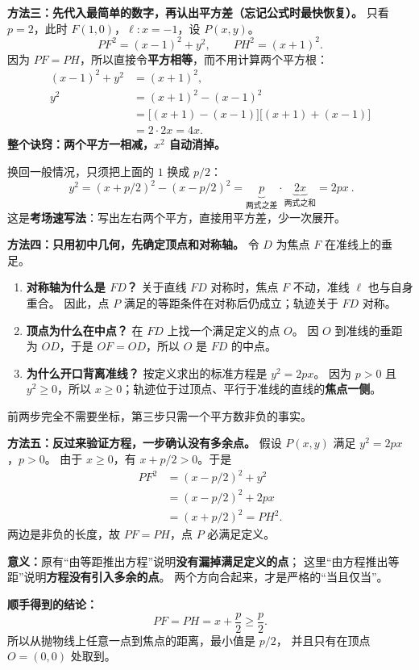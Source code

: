 \clearpage
\begin{proofbox}
\textbf{方法三：先代入最简单的数字，再认出平方差（忘记公式时最快恢复）。}
只看 $p=2$，此时 $F(1,0)$，$\ell:x=-1$，设 $P(x,y)$。
\[
PF^2=(x-1)^2+y^2,\qquad PH^2=(x+1)^2.
\]
因为 $PF=PH$，所以直接令\textbf{平方相等}，而不用计算两个平方根：
\[
\begin{aligned}
(x-1)^2+y^2&=(x+1)^2,\\
y^2&=(x+1)^2-(x-1)^2\\
&=\big[(x+1)-(x-1)\big]\big[(x+1)+(x-1)\big]\\
&=2\cdot2x=\boxed{4x}.
\end{aligned}
\]
\textbf{整个诀窍：两个平方一相减，$x^2$ 自动消掉。}

换回一般情况，只须把上面的 $1$ 换成 $p/2$：
\[
\boxed{\ y^2=(x+p/2)^2-(x-p/2)^2
=\underbrace{p}_{\text{两式之差}}\cdot\underbrace{2x}_{\text{两式之和}}=2px\ }.
\]
这是\textbf{考场速写法}：写出左右两个平方，直接用平方差，少一次展开。
\end{proofbox}
\clearpage
\begin{proofbox}
\textbf{方法四：只用初中几何，先确定顶点和对称轴。}
令 $D$ 为焦点 $F$ 在准线上的垂足。
\begin{enumerate}[leftmargin=*]
\item \textbf{对称轴为什么是 $FD$？} 关于直线 $FD$ 对称时，焦点 $F$ 不动，准线 $\ell$ 也与自身重合。
因此，点 $P$ 满足的等距条件在对称后仍成立；轨迹关于 $FD$ 对称。
\item \textbf{顶点为什么在中点？} 在 $FD$ 上找一个满足定义的点 $O$。
因 $O$ 到准线的垂距为 $OD$，于是 $OF=OD$，所以 $O$ 是 $FD$ 的中点。
\item \textbf{为什么开口背离准线？} 按定义求出的标准方程是 $y^2=2px$。
因为 $p>0$ 且 $y^2\ge0$，所以 $x\ge0$；轨迹位于过顶点、平行于准线的直线的\textbf{焦点一侧}。
\end{enumerate}
前两步完全不需要坐标，第三步只需一个平方数非负的事实。
\end{proofbox}
\clearpage
\begin{proofbox}
\textbf{方法五：反过来验证方程，一步确认没有多余点。}
假设 $P(x,y)$ 满足 $y^2=2px$，$p>0$。
由于 $x\ge0$，有 $x+p/2>0$。于是
\[
\begin{aligned}
PF^2&=(x-p/2)^2+y^2\\
&=(x-p/2)^2+2px\\
&=(x+p/2)^2=PH^2.
\end{aligned}
\]
两边是非负的长度，故 $PF=PH$，点 $P$ 必满足定义。

\textbf{意义：}原有“由等距推出方程”说明\textbf{没有漏掉满足定义的点}；
这里“由方程推出等距”说明\textbf{方程没有引入多余的点}。
两个方向合起来，才是严格的“当且仅当”。

\textbf{顺手得到的结论：}
\[
\boxed{PF=PH=x+\frac p2\ge\frac p2}.
\]
所以从抛物线上任意一点到焦点的距离，最小值是 $p/2$，
并且只有在顶点 $O=(0,0)$ 处取到。
\end{proofbox}
